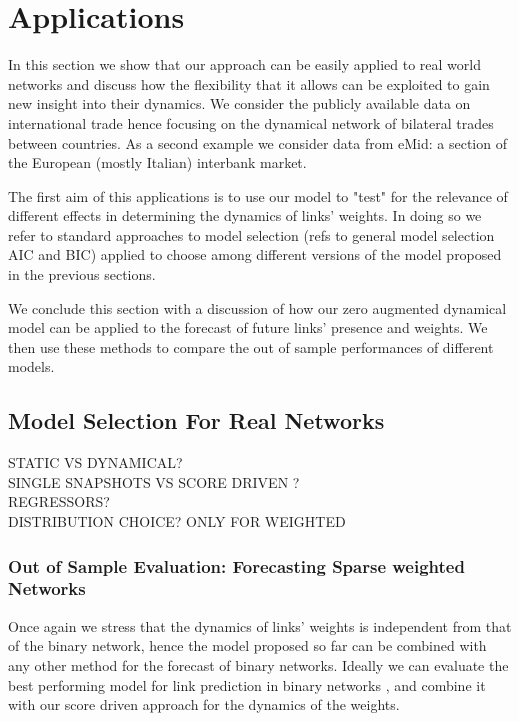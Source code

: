 \documentclass[a4paper,12pt]{article}
\begin{document}
\section{Applications}
In this section we show that our approach can be easily applied to real world networks and discuss how the flexibility that it allows can be exploited to gain new insight into their dynamics. We consider the publicly available data on international trade hence focusing on the dynamical network of bilateral trades between countries. As a second example we consider data from eMid: a section of the European (mostly Italian) interbank market.

The first aim of this applications is to use our model to "test" for the relevance of different effects in determining the dynamics of links' weights. In doing so we refer to standard approaches to model selection (refs to general model selection AIC and BIC) applied to choose among different versions of the model proposed in the previous sections. 
 
We conclude this section with a discussion of how our zero augmented dynamical model can be applied to the forecast of future links' presence and weights. We then use these methods to compare the out of sample performances of different models.
\subsection{Model Selection For Real Networks}
STATIC VS DYNAMICAL?\\
SINGLE SNAPSHOTS VS SCORE DRIVEN ? \\
REGRESSORS?\\
DISTRIBUTION CHOICE? ONLY FOR WEIGHTED\\
\subsubsection{Out of Sample Evaluation: Forecasting Sparse weighted Networks}
Once again we stress that the dynamics of links' weights is independent from that of the binary network, hence the model proposed so far can be combined with any other method for the forecast of binary networks.
Ideally we can evaluate the best performing model for link prediction in binary networks \citep[as discussed for example in][]{haghani2017systemic}, and combine it with our score driven approach for the dynamics of the weights.
\end{document}
